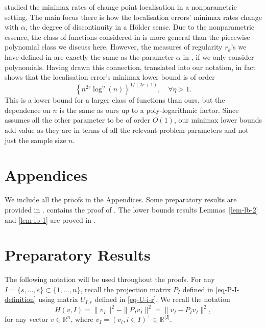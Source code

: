 \documentclass{article}
\begin{document}
\cite{raimondo1998minimax} studied the minimax rates of change point localisation in a nonparametric setting.  The main focus there is how the localisation errors' minimax rates change with $\alpha$, the degree of discontinuity in a H\"{o}lder sense.  Due to the nonparametric essence, the class of functions considered in \cite{raimondo1998minimax} is more general than the piecewise polynomial class we discuss here.  However, the measures of regularity $r_k$'s we have defined in  are exactly the same as the parameter $\alpha$ in \cite{raimondo1998minimax}, if we only consider polynomials.  Having drawn this connection, translated into our notation, \cite{raimondo1998minimax} in fact shows that the localisation error's minimax lower bound is of order 
	\[
		\left\{n^{2r}\log^{\eta}(n)\right\}^{1/(2r+1)}, \quad \forall \eta > 1.
	\]
	This is a lower bound for a larger class of functions than ours, but the dependence on $n$ is the same as ours up to a poly-logarithmic factor. Since \cite{raimondo1998minimax} assumes all the other parameter to be of order $O(1)$, our minimax lower bounds add value as they are in terms of all the relevant problem parameters and not just the sample size $n$. 


 

\appendix
\section*{Appendices}

We include all the proofs in the Appendices.  Some preparatory results are provided in .   contains the proof of .  The lower bounds results Lemmas~\ref{lem-lb-2} and \ref{lem-lb-1} are proved in .

\section{Preparatory Results}\label{sec-proofs}

The following notation will be used throughout the proofs. For any $I = \{s, \ldots, e\} \subset \{1, \ldots, n\}$, recall the projection matrix $P_I$ defined in \eqref{eq-P-I-definition} using matrix $U_{I, r}$ defined in \eqref{eq-U-i-r}.  We recall the notation
	\[
		H(v, I) = \|v_I\|^2 - \|P_I v_I\|^2 = \|v_I - P_I v_I\|^2,
	\]
	for any vector $v \in \mathbb{R}^n$, where $v_I = (v_i, i \in I)^{\top} \in \mathbb{R}^{|I|}$.
\end{document}
